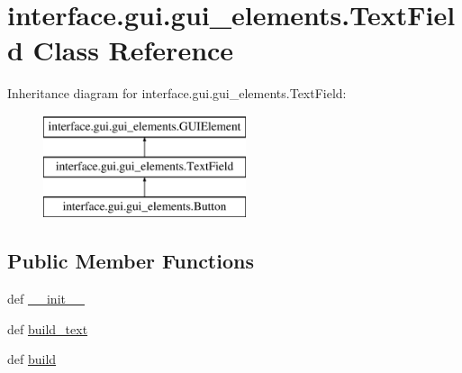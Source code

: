 \hypertarget{classinterface_1_1gui_1_1gui__elements_1_1_text_field}{\section{interface.\-gui.\-gui\-\_\-elements.\-Text\-Field \-Class \-Reference}
\label{classinterface_1_1gui_1_1gui__elements_1_1_text_field}
}
\-Inheritance diagram for interface.\-gui.\-gui\-\_\-elements.\-Text\-Field\-:\begin{figure}[H]
\begin{center}
\leavevmode
\includegraphics[height=3.000000cm]{classinterface_1_1gui_1_1gui__elements_1_1_text_field}
\end{center}
\end{figure}
\subsection*{\-Public \-Member \-Functions}
\begin{DoxyCompactItemize}
\item 
def \hyperlink{classinterface_1_1gui_1_1gui__elements_1_1_text_field_a376866601a13829059a8101262b37284}{\-\_\-\-\_\-init\-\_\-\-\_\-}
\item 
def \hyperlink{classinterface_1_1gui_1_1gui__elements_1_1_text_field_ab21b54ae20b549beda3132413023fc7d}{build\-\_\-text}
\item 
def \hyperlink{classinterface_1_1gui_1_1gui__elements_1_1_text_field_abcc8ace38587590d7d90997eb84f97d6}{build}
\end{DoxyCompactItemize}
